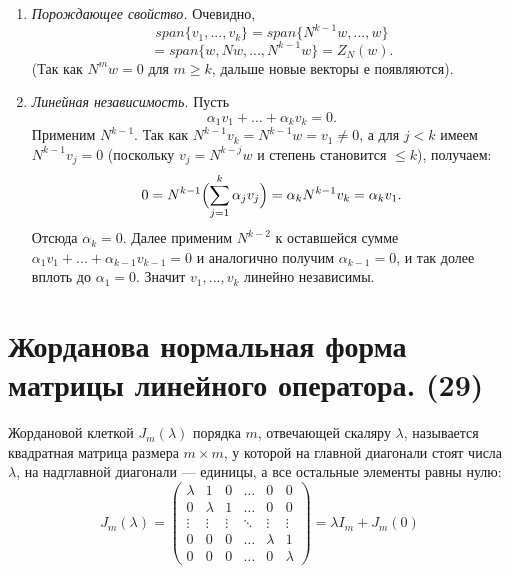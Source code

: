 \documentclass[14pt]{extreport}
\begin{document}
    \begin{prbox}
        \begin{enumerate}
            \item \textit{Порождающее свойство.} Очевидно,
            \[
            span \{ v_1,...,v_k \} = span \{ N^{k-1}w,...,w \} 
            \]
            \vspace{-1.2cm}
            \[
            = span \{ w,Nw,...,N^{k-1}w \} = Z_N(w).
            \]
            (Так как $N^mw = 0$ для $m \geq k$, дальше новые векторы е появляются).
            \item \textit{Линейная независимость.} Пусть
            \[
            \alpha_1v_1 + ... + \alpha_kv_k = 0.
            \]
            Применим $N^{k-1}$. Так как $N^{k-1}v_k = N^{k-1}w = v_1 \neq 0$, а для $j<k$ имеем $N^{k-1}v_j = 0$ (поскольку $v_j = N^{k-j}w$ и степень становится $\leq k$), получаем:
            \[
            0 = N^{k-1} \Bigl( \sum_{j=1}^k \alpha_jv_j \Bigr) = \alpha_k N^{k-1}v_k = \alpha_kv_1.
            \]
            Отсюда $\alpha_k=0$. Далее применим $N^{k-2}$ к оставшейся сумме $\alpha_1v_1 + ... + \alpha_{k-1}v_{k-1} = 0$ и аналогично получим $\alpha_{k-1} = 0$, и так долее вплоть до $\alpha_1 = 0$. Значит $v_1,...,v_k$ линейно независимы.
        \end{enumerate}
    \end{prbox}

    \chapter{Жорданова нормальная форма матрицы линейного оператора. (29)}

    \begin{defbox}
        Жордановой клеткой $J_m(\lambda)$ порядка $m$, отвечающей скаляру $\lambda$, называется квадратная матрица размера $m \times m$, у которой на главной диагонали стоят числа $\lambda$, на надглавной диагонали — единицы, а все остальные элементы равны нулю:$$J_m(\lambda) = \begin{pmatrix} 
\lambda & 1 & 0 & \dots & 0 & 0 \\ 
0 & \lambda & 1 & \dots & 0 & 0 \\ 
\vdots & \vdots & \vdots & \ddots & \vdots & \vdots \\ 
0 & 0 & 0 & \dots & \lambda & 1 \\ 
0 & 0 & 0 & \dots & 0 & \lambda 
\end{pmatrix} = \lambda I_m + J_m(0)$$
    \end{defbox}
\end{document}
